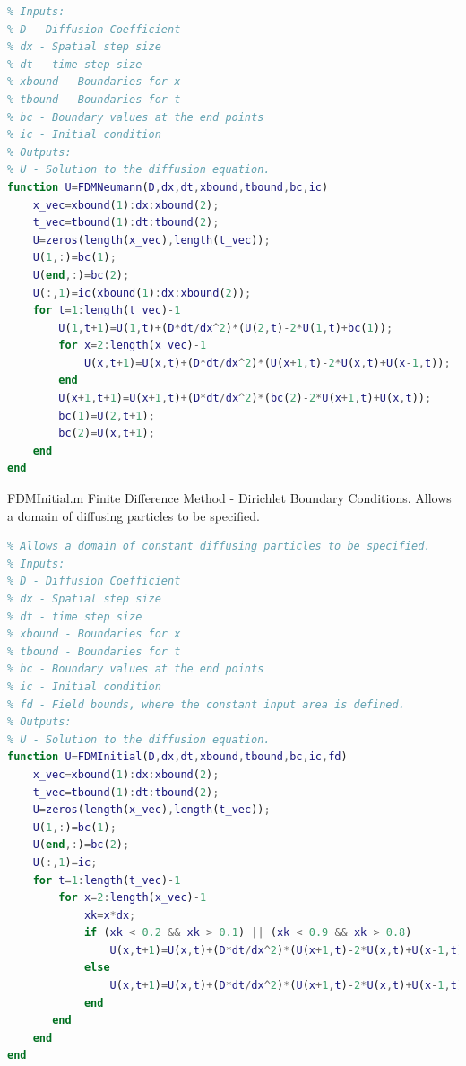 \documentclass{article}
\begin{document}
\begin{lstlisting}[language=MATLAB]
% Finite Difference Method with Neumann Boundary Conditions.
% Inputs:
% D - Diffusion Coefficient
% dx - Spatial step size
% dt - time step size
% xbound - Boundaries for x
% tbound - Boundaries for t
% bc - Boundary values at the end points
% ic - Initial condition
% Outputs:
% U - Solution to the diffusion equation.
function U=FDMNeumann(D,dx,dt,xbound,tbound,bc,ic)
    x_vec=xbound(1):dx:xbound(2);
    t_vec=tbound(1):dt:tbound(2);
    U=zeros(length(x_vec),length(t_vec));
    U(1,:)=bc(1);
    U(end,:)=bc(2);
    U(:,1)=ic(xbound(1):dx:xbound(2));
    for t=1:length(t_vec)-1
        U(1,t+1)=U(1,t)+(D*dt/dx^2)*(U(2,t)-2*U(1,t)+bc(1));
        for x=2:length(x_vec)-1
            U(x,t+1)=U(x,t)+(D*dt/dx^2)*(U(x+1,t)-2*U(x,t)+U(x-1,t));
        end
        U(x+1,t+1)=U(x+1,t)+(D*dt/dx^2)*(bc(2)-2*U(x+1,t)+U(x,t));
        bc(1)=U(2,t+1);
        bc(2)=U(x,t+1);
    end
end
\end{lstlisting}
FDMInitial.m Finite Difference Method - Dirichlet Boundary Conditions. Allows a domain of diffusing particles to be specified.
\begin{lstlisting}[language=MATLAB]
% Finite Difference Method with Dirichlet Boundary Conditions
% Allows a domain of constant diffusing particles to be specified.
% Inputs:
% D - Diffusion Coefficient
% dx - Spatial step size
% dt - time step size
% xbound - Boundaries for x
% tbound - Boundaries for t
% bc - Boundary values at the end points
% ic - Initial condition
% fd - Field bounds, where the constant input area is defined.
% Outputs:
% U - Solution to the diffusion equation.
function U=FDMInitial(D,dx,dt,xbound,tbound,bc,ic,fd)
    x_vec=xbound(1):dx:xbound(2);
    t_vec=tbound(1):dt:tbound(2);
    U=zeros(length(x_vec),length(t_vec));
    U(1,:)=bc(1);
    U(end,:)=bc(2);
    U(:,1)=ic;
    for t=1:length(t_vec)-1
        for x=2:length(x_vec)-1
            xk=x*dx;
            if (xk < 0.2 && xk > 0.1) || (xk < 0.9 && xk > 0.8)
                U(x,t+1)=U(x,t)+(D*dt/dx^2)*(U(x+1,t)-2*U(x,t)+U(x-1,t))+1*dt;
            else
                U(x,t+1)=U(x,t)+(D*dt/dx^2)*(U(x+1,t)-2*U(x,t)+U(x-1,t));
            end
       end
    end
end
\end{lstlisting}
\end{document}
